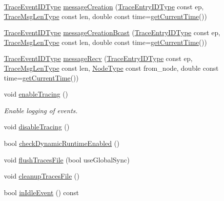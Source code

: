 \begin{DoxyCompactItemize}
\hyperlink{namespacevt_1_1trace_a64a7185f3e102df8d8258f263ccd1582}{Trace\+Event\+I\+D\+Type} \hyperlink{structvt_1_1trace_1_1_trace_a5b5091197568d7ed104bb40d68b4ddd7}{message\+Creation} (\hyperlink{namespacevt_1_1trace_a3c14050715ba9eceaeff51fb3de64f2f}{Trace\+Entry\+I\+D\+Type} const ep, \hyperlink{namespacevt_1_1trace_aeb598f45d67d41db7902e494f2f0ce59}{Trace\+Msg\+Len\+Type} const len, double const time=\hyperlink{structvt_1_1trace_1_1_trace_a04cf6b76b4ced1bc90d246a34c948db5}{get\+Current\+Time}())
\item 
\hyperlink{namespacevt_1_1trace_a64a7185f3e102df8d8258f263ccd1582}{Trace\+Event\+I\+D\+Type} \hyperlink{structvt_1_1trace_1_1_trace_ad034b14649101fb530eccfb4e2b958ce}{message\+Creation\+Bcast} (\hyperlink{namespacevt_1_1trace_a3c14050715ba9eceaeff51fb3de64f2f}{Trace\+Entry\+I\+D\+Type} const ep, \hyperlink{namespacevt_1_1trace_aeb598f45d67d41db7902e494f2f0ce59}{Trace\+Msg\+Len\+Type} const len, double const time=\hyperlink{structvt_1_1trace_1_1_trace_a04cf6b76b4ced1bc90d246a34c948db5}{get\+Current\+Time}())
\item 
\hyperlink{namespacevt_1_1trace_a64a7185f3e102df8d8258f263ccd1582}{Trace\+Event\+I\+D\+Type} \hyperlink{structvt_1_1trace_1_1_trace_aa14d58fb03a226e213f72bb03a13bb9f}{message\+Recv} (\hyperlink{namespacevt_1_1trace_a3c14050715ba9eceaeff51fb3de64f2f}{Trace\+Entry\+I\+D\+Type} const ep, \hyperlink{namespacevt_1_1trace_aeb598f45d67d41db7902e494f2f0ce59}{Trace\+Msg\+Len\+Type} const len, \hyperlink{namespacevt_a866da9d0efc19c0a1ce79e9e492f47e2}{Node\+Type} const from\+\_\+node, double const time=\hyperlink{structvt_1_1trace_1_1_trace_a04cf6b76b4ced1bc90d246a34c948db5}{get\+Current\+Time}())
\item 
void \hyperlink{structvt_1_1trace_1_1_trace_ae7ef14764ce87e0ea8baf802db400066}{enable\+Tracing} ()
\begin{DoxyCompactList}\small\item\em Enable logging of events. \end{DoxyCompactList}\item 
void \hyperlink{structvt_1_1trace_1_1_trace_a54f34dbcf8960de7b319e44ef9b76eb0}{disable\+Tracing} ()
\item 
bool \hyperlink{structvt_1_1trace_1_1_trace_a4b911a4f90a4b6b76c03341db7d94fdd}{check\+Dynamic\+Runtime\+Enabled} ()
\item 
void \hyperlink{structvt_1_1trace_1_1_trace_a2e07094a48c47b9c591003f0b57305c7}{flush\+Traces\+File} (bool use\+Global\+Sync)
\item 
void \hyperlink{structvt_1_1trace_1_1_trace_ac764c356a7f81abadfe643d618f22b15}{cleanup\+Traces\+File} ()
\item 
bool \hyperlink{structvt_1_1trace_1_1_trace_a1e7429d95dbddd9f235a02800d158d36}{in\+Idle\+Event} () const
\end{DoxyCompactItemize}
